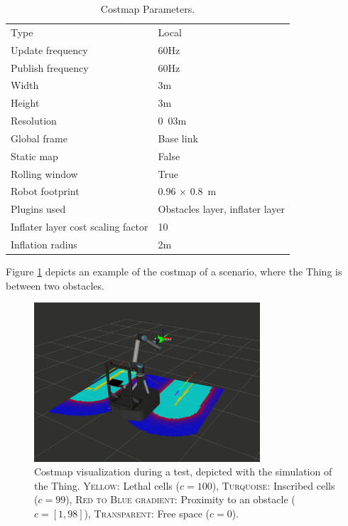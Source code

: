 \begin{table}
\begin{center}
 \caption{Costmap Parameters.}\vspace{1ex}
 \label{tab:costmap_params}
 \begin{tabular}{ll}
 \hline
Type & Local \\
Update frequency & \unit{60}{Hz} \\
Publish frequency & \unit{60}{Hz} \\ 
Width & \unit{3}{m} \\
Height & \unit{3}{m} \\
Resolution & \unit{0.03}{m} \\
Global frame & Base link \\
Static map & False \\
Rolling window & True \\
Robot footprint & \unit{0.96 $\times$ 0.8}{m} \\
Plugins used & Obstacles layer, inflater layer \\
Inflater layer cost scaling factor & 10  \\
Inflation radius & \unit{2}{m} \\
 \hline
 \end{tabular}
\end{center}
\end{table}

Figure \ref{pics:costmap} depicts an example of the costmap of a scenario, where the Thing is between two obstacles.

\begin{figure}
   \centering
   \includegraphics[width=0.75\textwidth]{images/costmap.png}
   \caption{Costmap visualization during a test, depicted with the simulation of the Thing.  \textsc{Yellow:} Lethal cells ($c = 100$), \textsc{Turquoise:} Inscribed cells ($c = 99$), \textsc{Red to Blue gradient:} Proximity to an obstacle ($c = [1,98]$), \textsc{Transparent:} Free space ($c = 0$).}
   \label{pics:costmap}
\end{figure}

